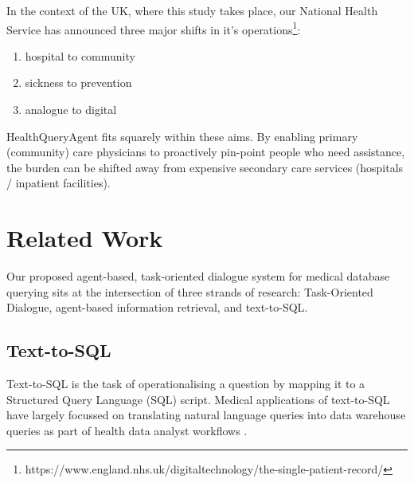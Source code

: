 \documentclass[11pt]{article}
\begin{document}


In the context of the UK, where this study takes place, our National Health Service has announced three major shifts in it's operations\footnote{https://www.england.nhs.uk/digitaltechnology/the-single-patient-record/}:

\begin{enumerate}
	\item hospital to community
	\item sickness to prevention
	\item analogue to digital
\end{enumerate}

HealthQueryAgent fits squarely within these aims. By enabling primary (community) care physicians to proactively pin-point people who need assistance, the burden can be shifted away from expensive secondary care services (hospitals / inpatient facilities).

\section{Related Work}

Our proposed agent-based, task-oriented dialogue system for medical database querying sits at the intersection of three strands of research: Task-Oriented Dialogue, agent-based information retrieval, and text-to-SQL.

\subsection{Text-to-SQL}
Text-to-SQL is the task of operationalising a question by mapping it to a Structured Query Language (SQL) script. Medical applications of text-to-SQL have largely focussed on translating natural language queries into data warehouse queries as part of health data analyst workflows \citet{ziletti_retrieval_2024, ziletti_generating_2025}.
\end{document}
